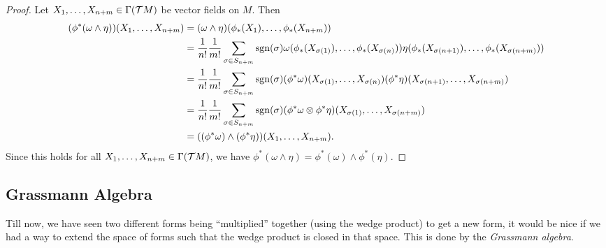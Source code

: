 \begin{proof}
    Let \(X_1, \ldots, X_{n+m} \in \Gamma(\mathcal T M)\) be vector fields on \(M\). Then
    \begin{align*}
        (\phi^*(\omega \wedge \eta))(X_1, \ldots, X_{n+m}) & = (\omega \wedge \eta)(\phi_*(X_1), \ldots, \phi_*(X_{n+m}))                                                                                                                                   \\
                                                           & = \frac{1}{n!} \frac{1}{m!} \sum_{\sigma \in S_{n+m}} \operatorname{sgn}(\sigma) \omega(\phi_*(X_{\sigma(1)}), \ldots, \phi_*(X_{\sigma(n)})) \eta(\phi_*(X_{\sigma(n+1)}), \ldots, \phi_*(X_{\sigma(n+m)})) \\
                                                           & = \frac{1}{n!} \frac{1}{m!} \sum_{\sigma \in S_{n+m}} \operatorname{sgn}(\sigma) (\phi^* \omega)(X_{\sigma(1)}, \ldots, X_{\sigma(n)}) (\phi^* \eta)(X_{\sigma(n+1)}, \ldots, X_{\sigma(n+m)})               \\
                                                           & = \frac{1}{n!} \frac{1}{m!} \sum_{\sigma \in S_{n+m}} \operatorname{sgn}(\sigma) (\phi^* \omega \otimes \phi^* \eta)(X_{\sigma(1)}, \ldots, X_{\sigma(n+m)})                                                 \\
                                                           & = ((\phi^* \omega) \wedge (\phi^* \eta))(X_1, \ldots, X_{n+m}).
    \end{align*}
    Since this holds for all \(X_1, \ldots, X_{n+m} \in \Gamma(\mathcal T M)\), we have \(\phi^*(\omega \wedge \eta) = \phi^*(\omega) \wedge \phi^*(\eta)\).
\end{proof}

\subsection{Grassmann Algebra}

Till now, we have seen two different forms being ``multiplied'' together (using the wedge product) to get a new form, it would be nice if we had a way to extend the space of forms such that the wedge product is closed in that space. This is done by the \emph{Grassmann algebra}.

